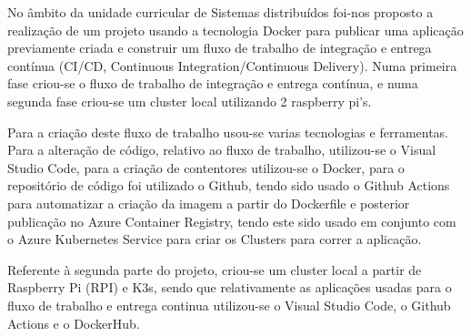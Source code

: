 \par No âmbito da unidade curricular de Sistemas distribuídos foi-nos proposto a realização de um projeto usando a tecnologia Docker para publicar uma aplicação previamente criada e construir um fluxo de trabalho de integração e entrega contínua (CI/CD, Continuous Integration/Continuous Delivery). Numa primeira fase criou-se o fluxo de trabalho de integração e entrega contínua, e numa segunda fase criou-se um cluster local utilizando 2 raspberry pi's.

\par Para a criação deste fluxo de trabalho usou-se varias tecnologias e ferramentas. Para a alteração de código, relativo ao fluxo de trabalho, utilizou-se o Visual Studio Code, para a criação de contentores utilizou-se o Docker, para o repositório de código foi utilizado o Github, tendo sido usado o Github Actions para automatizar a criação da imagem a partir do Dockerfile e posterior publicação no Azure Container Registry, tendo este sido usado em conjunto com o Azure Kubernetes Service para criar os Clusters para correr a aplicação.

\par Referente à segunda parte do projeto, criou-se um cluster local a partir de Raspberry Pi (RPI) e K3s, sendo que relativamente as aplicações usadas para o fluxo de trabalho e entrega continua utilizou-se o Visual Studio Code, o Github Actions e o DockerHub.
